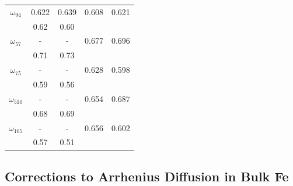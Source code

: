 \documentclass[preprint,12pt]{elsarticle}
\providecommand{\DIFaddend}{\protect\color{black}} %
\DeclareRobustCommand{\DIFaddend}{\DIFOaddend \let\includegraphics\DIFOincludegraphics} %
\begin{document}
\begin{table}[!ht]
\begin{tabular}{|c|c|c|c|c|}
       \hline
       $\omega_{94}$  &0.622 &0.639 &0.608 &0.621 \\
       & 0.62 \cite{ke2025diffusion}& 0.60 \cite{ke2025diffusion}&&\\
       \hline
       $\omega_{57}$ &- &- &0.677 &0.696 \\
       & 0.71 \cite{ke2025diffusion}& 0.73 \cite{ke2025diffusion}&&\\
       \hline
       $\omega_{75}$  &- &- &0.628 &0.598 \\
       & 0.59 \cite{ke2025diffusion}& 0.56 \cite{ke2025diffusion}&&\\
       \hline
       $\omega_{510}$ &- &- &0.654 &0.687 \\ 
       & 0.68 \cite{ke2025diffusion}& 0.69 \cite{ke2025diffusion}&&\\
       \hline
       $\omega_{105}$  &- &- &0.656 &0.602 \\
       & 0.57 \cite{ke2025diffusion}& 0.51 \cite{ke2025diffusion}&&\\
       \hline
    \end{tabular}
\end{table}
\DIFaddend 



\FloatBarrier
\subsection{Corrections to Arrhenius Diffusion in Bulk Fe}
\end{document}
